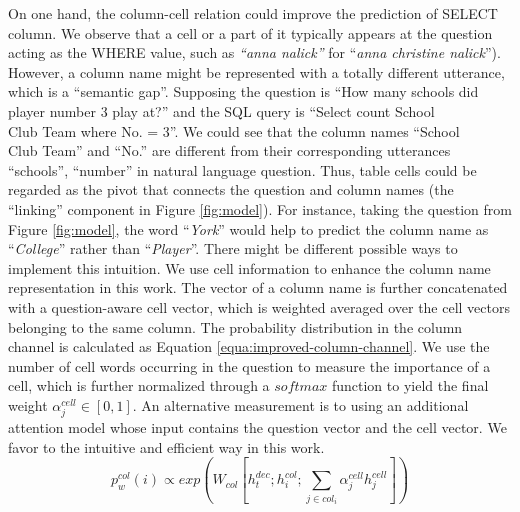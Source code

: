 \documentclass[11pt,a4paper]{article}
\begin{document}
On one hand, the column-cell relation could improve the prediction of SELECT column.
We observe that a cell or a part of it typically appears at the question acting as the WHERE value, such as \textit{``anna nalick''} for ``\textit{anna christine nalick}'').
However, a column name might be represented with a totally different utterance, which is a ``semantic gap''.
Supposing the question is ``How many schools did player number 3 play at?'' and the SQL query is ``Select count School\\Club Team where No. = 3''. We could see that the column names ``School\\Club Team'' and ``No.'' are different from their corresponding utterances ``schools'', ``number'' in natural language question. 
Thus, table cells could be regarded as the pivot that connects the question and column names (the ``linking'' component in Figure \ref{fig:model}).
For instance, taking the question from Figure \ref{fig:model},
the word ``\textit{York}'' would help to predict the column name as ``\textit{College}'' rather than ``\textit{Player}''.
There might be different possible ways to implement this intuition.
We use cell information to enhance the \mbox{column} name representation in this work.
The vector of a column name is further concatenated with a question-aware cell vector, which is weighted averaged over
the cell vectors belonging to the same column. The probability distribution in the column channel is calculated as Equation \ref{equa:improved-column-channel}.
We use the number of cell words occurring in the question to measure
the importance of a cell, which is further normalized through a $softmax$ function to yield the final weight $\alpha^{cell}_j \in [0,1]$. An alternative measurement is to using an additional attention model whose input contains the question vector and the cell vector. We favor to the intuitive and efficient way in this work.
\begin{equation}\label{equa:improved-column-channel}
p_w^{col}(i)  \propto exp(W_{col} [h^{dec}_t;h^{col}_i;\sum_{j \in col_i} \alpha^{cell}_j h^{cell}_j])
\end{equation}
\end{document}

